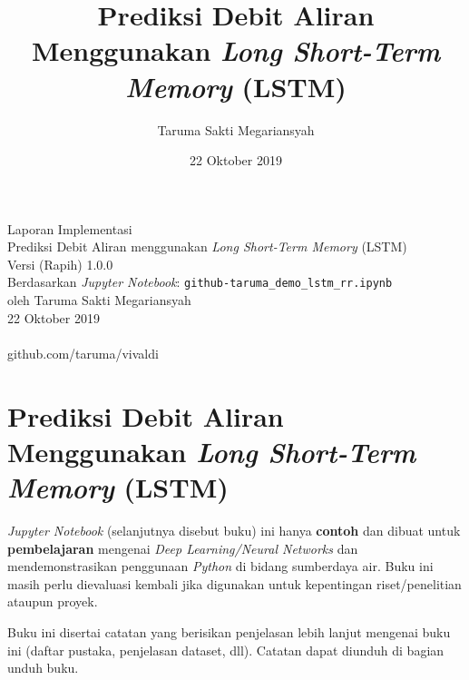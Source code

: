 \documentclass[11pt]{article}
\title{Prediksi Debit Aliran Menggunakan \emph{Long Short-Term Memory} (LSTM)}
\author{Taruma Sakti Megariansyah}
\date{22 Oktober 2019}
\let\oldsection\section
\renewcommand\section{\clearpage\oldsection}
\begin{document}
   
	\begin{titlepage}
		\vspace*{\fill}
		\begin{center}
 		\normalsize Laporan Implementasi\\
		\huge Prediksi Debit Aliran menggunakan \emph{Long Short-Term Memory} (LSTM)\\ 
		\normalsize Versi (Rapih) 1.0.0 \\[0.2cm]
      	\small Berdasarkan \emph{Jupyter Notebook}: \texttt{github-taruma\_demo\_lstm\_rr.ipynb} \\[0.5cm]
		\normalsize oleh Taruma Sakti Megariansyah\\[0.5cm]
      	\normalsize 22 Oktober 2019\\[1cm]
    	\\
      	\normalsize github.com/taruma/vivaldi
		\end{center}
    	\vspace*{\fill}
	\end{titlepage}
    
    
    

    
    \hypertarget{prediksi-debit-aliran-menggunakan-long-short-term-memory-lstm}{%
\section{\texorpdfstring{Prediksi Debit Aliran Menggunakan \emph{Long
Short-Term Memory}
(LSTM)}{Prediksi Debit Aliran Menggunakan Long Short-Term Memory (LSTM)}}\label{prediksi-debit-aliran-menggunakan-long-short-term-memory-lstm}}

\emph{Jupyter Notebook} (selanjutnya disebut buku) ini hanya
\textbf{contoh} dan dibuat untuk \textbf{pembelajaran} mengenai
\emph{Deep Learning/Neural Networks} dan mendemonstrasikan penggunaan
\emph{Python} di bidang sumberdaya air. Buku ini masih perlu dievaluasi
kembali jika digunakan untuk kepentingan riset/penelitian ataupun
proyek.

Buku ini disertai catatan yang berisikan penjelasan lebih lanjut
mengenai buku ini (daftar pustaka, penjelasan dataset, dll). Catatan
dapat diunduh di bagian unduh buku.
\end{document}
